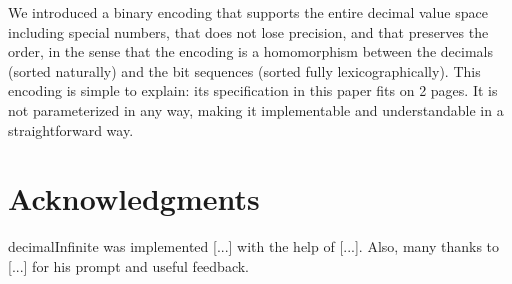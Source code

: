 \documentclass{acm_proc_article-sp}
\begin{document}
We introduced a binary encoding that supports the entire decimal value space including special numbers, that does not lose precision, and that preserves the order, in the sense that the encoding is a homomorphism between the decimals (sorted naturally) and the bit sequences (sorted fully lexicographically). This encoding is simple to explain: its specification in this paper fits on 2 pages. It is not parameterized in any way, making it implementable and understandable in a straightforward way.

\section{Acknowledgments}
decimalInfinite was implemented [...] with the help of [...]. Also, many thanks to [...] for his prompt and useful feedback.



\end{document}
